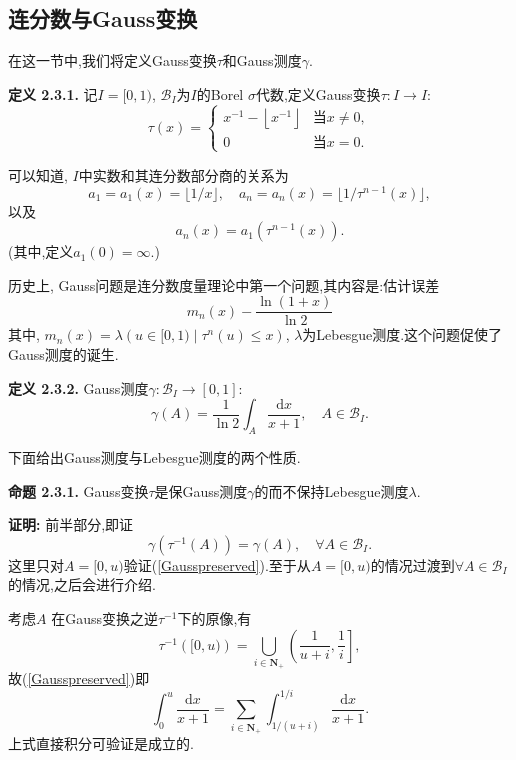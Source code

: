 \subsection{连分数与Gauss变换}
在这一节中,我们将定义Gauss变换$\tau$和Gauss测度$\gamma$.\par
\textbf{定义 2.3.1.  }
记$I=[0,1)$, $\mathcal{B}_I$为$I$的Borel $\sigma$代数,定义Gauss变换$\tau:I\to I:$
$$
    \tau\left(x\right)=\left\{
    \begin{array}{cc}
        x^{-1}-\left\lfloor x^{-1}\right\rfloor & \text{当}x\neq0, \\
        0                                       & \text{当}x=0.\end{array}\right.
$$
\par
可以知道, $I$中实数和其连分数部分商的关系为
$$a_1=a_1(x)=\lfloor1/x\rfloor,\quad a_n=a_n(x)=\lfloor1/\tau^{n-1}(x)\rfloor,$$
以及
\begin{equation}\label{tauandinquo}
    a_n\left(x\right)=a_1\left(\tau^{n-1}\left(x\right)\right).
\end{equation}
(其中,定义$a_1(0)=\infty$.)\par
历史上, Gauss问题是连分数度量理论中第一个问题,其内容是:估计误差
$$m_n(x)-\frac{\ln(1+x)}{\ln{2}}$$
其中, $m_n(x)=\lambda({u\in[0,1)\mid\tau^n(u)\leqslant x})$, $\lambda$为Lebesgue测度.这个问题促使了Gauss测度的诞生.\par
\textbf{定义 2.3.2.  }
Gauss测度$\gamma:\mathcal{B}_I\to[0,1]:$
$$\gamma\left(A\right)=\frac{1}{\ln2}\int_A\frac{\mathrm{d}x}{x+1},\quad A\in\mathcal{B}_I.$$
\par
下面给出Gauss测度与Lebesgue测度的两个性质.\par
\textbf{命题 2.3.1.  }\textsuperscript{\cite{Iosifescu}}
Gauss变换$\tau$是保Gauss测度$\gamma$的而不保持Lebesgue测度$\lambda$.
\par
\textbf{证明:  }
前半部分,即证
\begin{equation}\label{Gausspreserved}
    \gamma\left(\tau^{-1}(A)\right)=\gamma(A),\quad \forall A\in\mathcal{B}_I.
\end{equation}
这里只对$A=[0,u)$验证(\ref{Gausspreserved}).至于从$A=[0,u)$的情况过渡到$\forall A\in\mathcal{B}_I$的情况,之后会进行介绍.\par
考虑$A$
在Gauss变换之逆$\tau^{-1}$下的原像,有
$$\tau^{-1}\left([0,u)\right)=\bigcup_{i\in\mathbf{N}_+}\left(\frac{1}{u+i},\frac{1}{i}\right],$$
故(\ref{Gausspreserved})即
$$\int_0^u\frac{\mathrm{d}x}{x+1}=\sum\limits_{i\in\mathbf{N}_+}\int_{1/(u+i)}^{1/i}\frac{\mathrm{d}x}{x+1}.$$
上式直接积分可验证是成立的.
